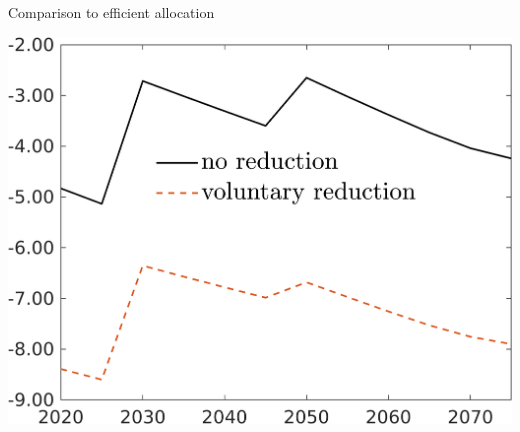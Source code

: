 \documentclass[11pt,aspectratio=169]{beamer}
\begin{document}
\begin{frame}{Comparison to efficient allocation}
\begin{minipage}[]{0.32\textwidth}
	\end{minipage}
\begin{minipage}[]{0.32\textwidth}
\includegraphics[width=1\textwidth]{../codding_model/own_basedOnFried/optimalPol_elastS_DisuSci/figures/all_1705/hl_CompEffOPT_T_NoTaus_spillover0_sep1_BN1_ineq1_redCOMP_etaa0.79_lgd1.png}
\end{minipage}



\end{frame}
\end{document}
